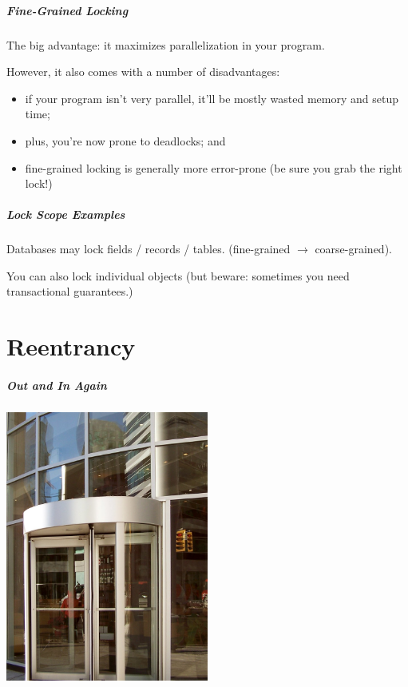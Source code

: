 \begin{frame}
\frametitle{Fine-Grained Locking} 

The big advantage: it maximizes parallelization in your program.

However, it also comes with a number of disadvantages:
  \begin{itemize}
    \item if your program isn't very parallel, it'll be mostly wasted memory and setup time;
    \item plus, you're now prone to deadlocks; and
    \item fine-grained locking is generally more error-prone (be sure you grab the right lock!)
  \end{itemize}

\end{frame}

\begin{frame}
\frametitle{Lock Scope Examples}


    Databases may lock fields / records / tables. (fine-grained $\rightarrow$ coarse-grained).

    You can also lock individual objects (but beware: sometimes you need transactional guarantees.)



\end{frame}

\part{Reentrancy}
\frame{\partpage}


\begin{frame}
\frametitle{Out and In Again}

\begin{center}
	\includegraphics[width=0.5\textwidth]{images/revolvingdoor.jpg}
\end{center}

\end{frame}



